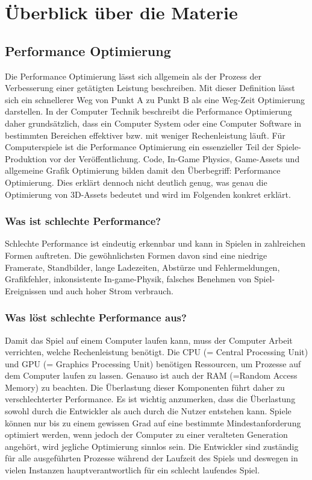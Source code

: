 \chapter{Überblick über die Materie}

\section{Performance Optimierung}

Die Performance Optimierung lässt sich allgemein als der Prozess der Verbesserung einer getätigten Leistung beschreiben. Mit dieser Definition lässt sich ein schnellerer Weg von Punkt A zu Punkt B als eine Weg-Zeit Optimierung darstellen. In der Computer Technik beschreibt die Performance Optimierung daher grundsätzlich, dass ein Computer System oder eine Computer Software in bestimmten Bereichen effektiver bzw. mit weniger Rechenleistung läuft. Für Computerspiele ist die Performance Optimierung ein essenzieller Teil der Spiele-Produktion vor der Veröffentlichung. Code, In-Game Physics, Game-Assets und allgemeine Grafik Optimierung bilden damit den Überbegriff: Performance Optimierung. Dies erklärt dennoch nicht deutlich genug, was genau die Optimierung von 3D-Assets bedeutet und wird im Folgenden konkret erklärt.\cite[648]{_advances}

\subsection{Was ist schlechte Performance?}

Schlechte Performance ist eindeutig erkennbar und kann in Spielen in zahlreichen Formen auftreten. Die gewöhnlichsten Formen davon sind eine niedrige Framerate, Standbilder, lange Ladezeiten, Abstürze und Fehlermeldungen, Grafikfehler, inkonsistente In-game-Physik, falsches Benehmen von Spiel-Ereignissen und auch hoher Strom verbrauch.

\subsection{Was löst schlechte Performance aus?}

Damit das Spiel auf einem Computer laufen kann, muss der Computer Arbeit verrichten, welche Rechenleistung benötigt. Die CPU (= Central Processing Unit) und GPU (= Graphics Processing Unit) benötigen Ressourcen, um Prozesse auf dem Computer laufen zu lassen. Genauso ist auch der RAM (=Random Access Memory) zu beachten. Die Überlastung dieser Komponenten führt daher zu verschlechterter Performance. Es ist wichtig anzumerken, dass die Überlastung sowohl durch die Entwickler als auch durch die Nutzer entstehen kann.\cite[17]{_unity_game_optimization} Spiele können nur bis zu einem gewissen Grad auf eine bestimmte Mindestanforderung optimiert werden, wenn jedoch der Computer zu einer veralteten Generation angehört, wird jegliche Optimierung sinnlos sein. Die Entwickler sind zuständig für alle ausgeführten Prozesse während der Laufzeit des Spiels und deswegen in vielen Instanzen hauptverantwortlich für ein schlecht laufendes Spiel.

